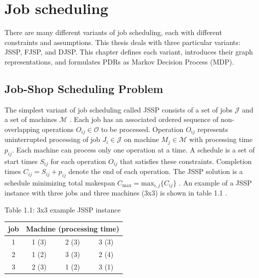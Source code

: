 \chapter{Job scheduling}
\label{chap:refs}

There are many different variants of job scheduling, each with different constraints and assumptions. This thesis deals with three particular variants: JSSP, FJSP, and DJSP. This chapter defines each variant, introduces their graph representations, and formulates PDRs as Markov Decision Process (MDP).

\section{Job-Shop Scheduling Problem}

The simplest variant of job scheduling called JSSP consists of a set of jobs $\mathcal{J}$ and a set of machines $\mathcal{M}$ \cite{YamadaNakanoJSSP}. Each job has an associated ordered sequence of non-overlapping operations $O_{ij} \in \mathcal{O}$ to be processed. Operation ${O}_{ij}$ represents uninterrupted processing of job $J_i \in \mathcal{J}$ on machine $M_j \in \mathcal{M}$ with processing time $p_{ij}$. Each machine can process only one operation at a time. A schedule is a set of start times $S_{ij}$ for each operation $O_{ij}$ that satisfies these constraints. Completion times $C_{ij} = S_{ij} + p_{ij}$ denote the end of each operation. The JSSP solution is a schedule minimizing total makespan $C_\text{max} = \text{max}_{i,j} \{C_{ij}\}$ \cite{zhang2020learning}. An example of a JSSP instance with three jobs and three machines (3x3) is shown in table 1.1 \cite{YamadaNakanoJSSP}.
\begin{table}[htbp]
    Table 1.1: 3x3 example JSSP instance \cite{YamadaNakanoJSSP}\\
    \vspace{1mm}
    \begin{tabular}{cccc}
    \hline
    job & \multicolumn{3}{c}{Machine (processing time)} \\ \hline
    1   & 1 (3)             & 2 (3)             & 3 (3)            \\
    2   & 1 (2)             & 3 (3)             & 2 (4)            \\
    3   & 2 (3)             & 1 (2)             & 3 (1)            \\ \hline
    \end{tabular}
\end{table}\\
